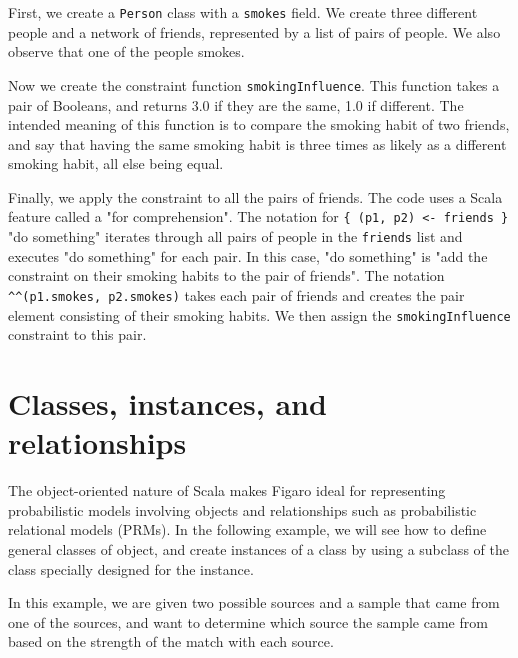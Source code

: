 First, we create a \texttt{Person} class with a \texttt{smokes} field. We create three different people and a network of friends, represented by a list of pairs of people. We also observe that one of the people smokes.

Now we create the constraint function \texttt{smokingInfluence}. This function takes a pair of Booleans, and returns 3.0 if they are the same, 1.0 if different. The intended meaning of this function is to compare the smoking habit of two friends, and say that having the same smoking habit is three times as likely as a different smoking habit, all else being equal.

Finally, we apply the constraint to all the pairs of friends. The code uses a Scala feature called a "for comprehension". The notation for \texttt{\{ (p1, p2) <- friends \}} { "do something" } iterates through all pairs of people in the \texttt{friends} list and executes "do something" for each pair. In this case, "do something" is "add the constraint on their smoking habits to the pair of friends". The notation \texttt{\textasciicircum \textasciicircum(p1.smokes, p2.smokes)} takes each pair of friends and creates the pair element consisting of their smoking habits. We then assign the \texttt{smokingInfluence} constraint to this pair.

\section{Classes, instances, and relationships}

The object-oriented nature of Scala makes Figaro ideal for representing probabilistic models involving objects and relationships such as probabilistic relational models (PRMs). 
In the following example, we will see how to define general classes of object, and create instances of a class by using a subclass of the class specially designed for the instance.

In this example, we are given two possible sources and a sample that came from one of the sources, and want to determine which source the sample came from based on the strength of the match with each
source.

